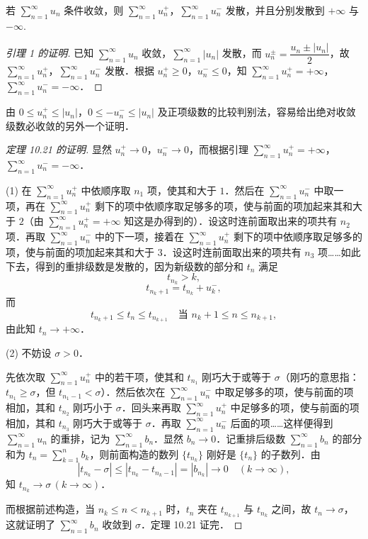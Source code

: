 \begin{lemma}\label{lem:10-5-1}
若 $\displaystyle\sum_{n=1}^{\infty}u_{n}$ 条件收敛，则 $\sum_{n=1}^{\infty}u_{n}^{+}$，$\sum_{n=1}^{\infty}u_{n}^{-}$ 发散，并且分别发散到 $+\infty$ 与 $-\infty$.
\end{lemma}

\begin{proof}[引理 1 的证明]
已知 $\displaystyle\sum_{n=1}^{\infty}u_{n}$ 收敛，$\sum_{n=1}^{\infty}|u_{n}|$ 发散，而 $u_{n}^{\pm}=\dfrac{u_{n}\pm|u_{n}|}{2}$，故 $\sum_{n=1}^{\infty}u_{n}^{+}$，$\sum_{n=1}^{\infty}u_{n}^{-}$ 发散．根据 $u_{n}^{+}\geqslant0$，$u_{n}^{-}\leqslant0$，知 $\sum_{n=1}^{\infty}u_{n}^{+}=+\infty$，$\sum_{n=1}^{\infty}u_{n}^{-}=-\infty$．
\end{proof}

由 $0\leqslant u_{n}^{+}\leqslant|u_{n}|$，$0\leqslant-u_{n}^{-}\leqslant|u_{n}|$ 及正项级数的比较判别法，容易给出绝对收敛级数必收敛的另外一个证明．

\begin{proof}[定理 10.21 的证明]
显然 $u_{n}^{+}\to0$，$u_{n}^{-}\to0$，而根据引理 $\displaystyle\sum_{n=1}^{\infty}u_{n}^{+}=+\infty$，$\sum_{n=1}^{\infty}u_{n}^{-}=-\infty$．

(1) 在 $\displaystyle\sum_{n=1}^{\infty}u_{n}^{+}$ 中依顺序取 $n_{1}$ 项，使其和大于 $1$．然后在 $\sum_{n=1}^{\infty}u_{n}^{-}$ 中取一项，再在 $\sum_{n=1}^{\infty}u_{n}^{+}$ 剩下的项中依顺序取足够多的项，使与前面的项加起来其和大于 $2$（由 $\sum_{n=1}^{\infty}u_{n}^{+}=+\infty$ 知这是办得到的）．设这时连前面取出来的项共有 $n_{2}$ 项．再取 $\sum_{n=1}^{\infty}u_{n}^{-}$ 中的下一项，接着在 $\sum_{n=1}^{\infty}u_{n}^{+}$ 剩下的项中依顺序取足够多的项，使与前面的项加起来其和大于 $3$．设这时连前面取出来的项共有 $n_{3}$ 项……如此下去，得到的重排级数是发散的，因为新级数的部分和 $t_{n}$ 满足
\[
t_{n_{k}}>k,
\]
\[
t_{n_{k}+1}=t_{n_{k}}+u_{k}^{-},
\]
而
\[
t_{n_{k}+1}\leqslant t_{n}\leqslant t_{n_{k+1}}\quad\text{当 }n_{k}+1\leqslant n\leqslant n_{k+1},
\]
由此知 $t_{n}\to+\infty$．

(2) 不妨设 $\sigma>0$．

先依次取 $\displaystyle\sum_{n=1}^{\infty}u_{n}^{+}$ 中的若干项，使其和 $t_{n_{1}}$ 刚巧大于或等于 $\sigma$（刚巧的意思指：$t_{n_{1}}\geqslant\sigma$，但 $t_{n_{1}-1}<\sigma$）．然后依次在 $\sum_{n=1}^{\infty}u_{n}^{-}$ 中取足够多的项，使与前面的项相加，其和 $t_{n_{2}}$ 刚巧小于 $\sigma$．回头来再取 $\sum_{n=1}^{\infty}u_{n}^{+}$ 中足够多的项，使与前面的项相加，其和 $t_{n_{3}}$ 刚巧大于或等于 $\sigma$．再取 $\sum_{n=1}^{\infty}u_{n}^{-}$ 后面的项……这样便得到 $\sum_{n=1}^{\infty}u_{n}$ 的重排，记为 $\sum_{n=1}^{\infty}b_{n}$．显然 $b_{n}\to0$．记重排后级数 $\sum_{n=1}^{\infty}b_{n}$ 的部分和为 $t_{n}=\sum_{k=1}^{n}b_{k}$，则前面构造的数列 $\{t_{n_{k}}\}$ 刚好是 $\{t_{n}\}$ 的子数列．由
\[
\left|t_{n_{k}}-\sigma\right|\leqslant\left|t_{n_{k}}-t_{n_{k}-1}\right|=\left|b_{n_{k}}\right|\to0\quad(k\to\infty),
\]
知 $t_{n_{k}}\to\sigma\,(k\to\infty)$．

而根据前述构造，当 $n_{k}\leqslant n<n_{k+1}$ 时，$t_{n}$ 夹在 $t_{n_{k+1}}$ 与 $t_{n_{k}}$ 之间，故 $t_{n}\to\sigma$，这就证明了 $\displaystyle\sum_{n=1}^{\infty}b_{n}$ 收敛到 $\sigma$．定理 10.21 证完．
\end{proof}

